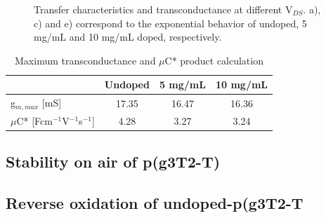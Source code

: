 \begin{figure}[ht]
    \qquad
    \caption{Transfer characteristics and transconductance at different V$_{DS}$. a), c) and e) correspond to the exponential behavior of undoped, 5 mg/mL and 10 mg/mL doped, respectively.}
    \label{fig:transfercurves}
\end{figure}

\begin{table}[ht]
\centering
\caption{Maximum transconductance and $\mu$C* product calculation}
\begin{tabular}{l|c|c|c}
& Undoped & 5 mg/mL & 10 mg/mL \\\hline
g$_{m,max}$ [mS] & 17.35 & 16.47 & 16.36\\
$\mu$C* [Fcm$^{-1}$V$^{-1}$s$^{-1}$] & 4.28 & 3.27 & 3.24\\\hline
\end{tabular}
\label{tab:fom}
\end{table}


\subsection{Stability on air of p(g3T2-T)}

\subsection{Reverse oxidation of undoped-p(g3T2-T}

